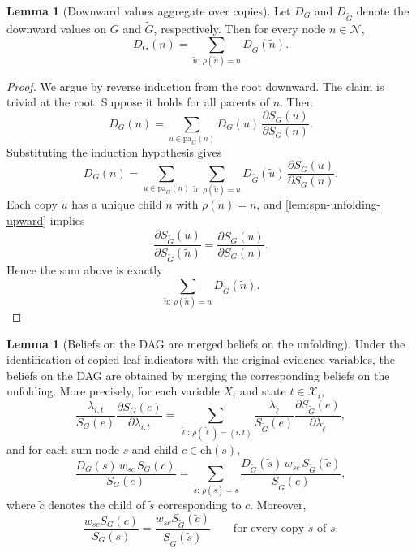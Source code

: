\documentclass[12pt]{article}
\newcommand{\1}{\mathbb{1}}
\theoremstyle{definition}
\newtheorem{lemma}[theorem]{Lemma}
\begin{document}
\begin{lemma}[Downward values aggregate over copies]
\label{lem:spn-unfolding-downward}
Let $D_G$ and $D_{\widetilde G}$ denote the downward values on $G$ and $\widetilde G$, respectively. Then for every node $n\in\mathcal N$,
\[
D_G(n)=\sum_{\tilde n:\,\rho(\tilde n)=n} D_{\widetilde G}(\tilde n).
\]
\end{lemma}

\begin{proof}
We argue by reverse induction from the root downward. The claim is trivial at the root. Suppose it holds for all parents of $n$. Then
\[
D_G(n)
=
\sum_{u\in\mathrm{pa}_G(n)}
D_G(u)\,
\frac{\partial S_G(u)}{\partial S_G(n)}.
\]
Substituting the induction hypothesis gives
\[
D_G(n)
=
\sum_{u\in\mathrm{pa}_G(n)}
\sum_{\tilde u:\,\rho(\tilde u)=u}
D_{\widetilde G}(\tilde u)\,
\frac{\partial S_G(u)}{\partial S_G(n)}.
\]
Each copy $\tilde u$ has a unique child $\tilde n$ with $\rho(\tilde n)=n$, and \cref{lem:spn-unfolding-upward} implies
\[
\frac{\partial S_{\widetilde G}(\tilde u)}{\partial S_{\widetilde G}(\tilde n)}
=
\frac{\partial S_G(u)}{\partial S_G(n)}.
\]
Hence the sum above is exactly
\[
\sum_{\tilde n:\,\rho(\tilde n)=n} D_{\widetilde G}(\tilde n).
\]
\end{proof}

\begin{lemma}[Beliefs on the DAG are merged beliefs on the unfolding]
\label{lem:spn-merge-beliefs}
Under the identification of copied leaf indicators with the original evidence variables, the beliefs on the DAG are obtained by merging the corresponding beliefs on the unfolding. More precisely, for each variable $X_i$ and state $t\in\mathcal X_i$,
\[
\frac{\lambda_{i,t}}{S_G(e)}\frac{\partial S_G(e)}{\partial \lambda_{i,t}}
=
\sum_{\tilde\ell:\,\rho(\tilde\ell)=(i,t)}
\frac{\lambda_{\tilde\ell}}{S_{\widetilde G}(e)}
\frac{\partial S_{\widetilde G}(e)}{\partial \lambda_{\tilde\ell}},
\]
and for each sum node $s$ and child $c\in\mathrm{ch}(s)$,
\[
\frac{D_G(s)\,w_{sc}\,S_G(c)}{S_G(e)}
=
\sum_{\tilde s:\,\rho(\tilde s)=s}
\frac{D_{\widetilde G}(\tilde s)\,w_{sc}\,S_{\widetilde G}(\tilde c)}
     {S_{\widetilde G}(e)},
\]
where $\tilde c$ denotes the child of $\tilde s$ corresponding to $c$. Moreover,
\[
\frac{w_{sc}S_G(c)}{S_G(s)}
=
\frac{w_{sc}S_{\widetilde G}(\tilde c)}{S_{\widetilde G}(\tilde s)}
\qquad
\text{for every copy }\tilde s\text{ of }s.
\]
\end{lemma}
\end{document}
